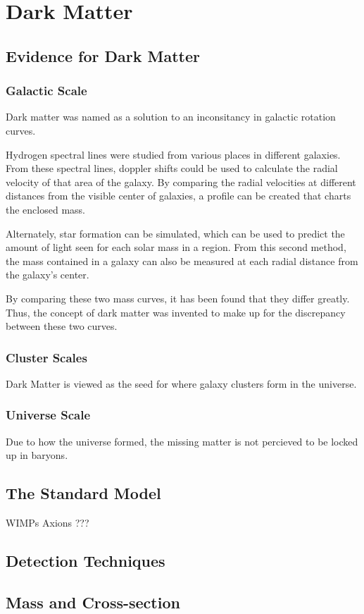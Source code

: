 \cleartooddpage[\thispagestyle{empty}]
\chapter{Dark Matter}

\section{Evidence for Dark Matter}

\subsection{Galactic Scale}

Dark matter was named as a solution to an inconsitancy in galactic rotation curves.

Hydrogen spectral lines were studied from various places in different galaxies.
From these spectral lines, doppler shifts could be used to calculate the radial velocity of that area of the galaxy.
By comparing the radial velocities at different distances from the visible center of galaxies, a profile can be created that charts the enclosed mass.

Alternately, star formation can be simulated, which can be used to predict the amount of light seen for each solar mass in a region.
From this second method, the mass contained in a galaxy can also be measured at each radial distance from the galaxy's center.

By comparing these two mass curves, it has been found that they differ greatly.
Thus, the concept of dark matter was invented to make up for the discrepancy between these two curves.



\subsection{Cluster Scales}

Dark Matter is viewed as the seed for where galaxy clusters form in the universe.

\subsection{Universe Scale}

Due to how the universe formed, the missing matter is not percieved to be locked up in baryons.



\section{The Standard Model}

WIMPs
Axions
???


\section{Detection Techniques}


\section{Mass and Cross-section}


